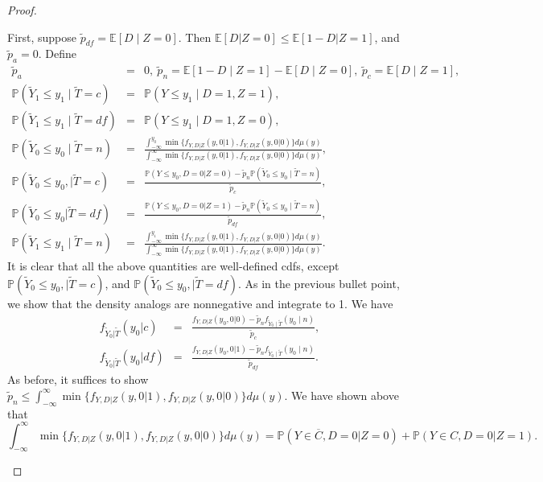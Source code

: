 \documentclass[12pt]{article}
\theoremstyle{plain}
\theoremstyle{definition}
\theoremstyle{remark}
\begin{document}
\begin{proof}
\begin{enumerate}
First, suppose $\tilde{p}_{df}=\mathbb E[D \mid Z=0]$. Then $\mathbb{E}[D  \vert  Z=0] \leq \mathbb{E}[1-D  \vert  Z=1]$, and $\tilde{p}_a=0$. Define
\begin{eqnarray*}
\tilde{p}_a &=& 0, \ \tilde{p}_n=\mathbb E[1-D \mid Z=1]-\mathbb E[D \mid Z=0], \ \tilde{p}_c=\mathbb E[D\mid Z=1],\\
\mathbb P(\tilde{Y}_1 \leq y_1\mid \tilde{T}=c) &=& \mathbb P(Y \leq y_1 \mid D=1, Z=1),\\
\mathbb P(\tilde{Y}_1 \leq y_1\mid \tilde{T}=df) &=& \mathbb P(Y \leq y_1 \mid D=1, Z=0),\\
\mathbb P(\tilde{Y}_0 \leq y_0 \mid \tilde{T}=n) &=& \frac{\int^{y_0}_{-\infty}\min\{f_{Y,D\vert Z}(y,0\vert 1),f_{Y,D\vert Z}(y,0\vert 0)\}d\mu(y)}{\int^{\infty}_{-\infty}\min\{f_{Y,D\vert Z}(y,0\vert 1),f_{Y,D\vert Z}(y,0\vert 0)\}d\mu(y)},\\
\mathbb P(\tilde{Y}_0 \leq y_0, \vert \tilde{T}=c) &=& \frac{\mathbb P(Y \leq y_0, D=0 \vert Z=0)-\tilde{p}_n \mathbb P(\tilde{Y}_0 \leq y_0 \mid \tilde{T}=n)}{\tilde{p}_c},\\
    \mathbb P(\tilde{Y}_0 \leq y_0 \vert \tilde{T}=df) &=& \frac{\mathbb P(Y \leq y_0, D=0 \vert Z=1)-\tilde{p}_n \mathbb P(\tilde{Y}_0 \leq y_0 \mid \tilde{T}=n)}{\tilde{p}_{df}},\\
    \mathbb P(\tilde{Y}_1 \leq y_1 \mid \tilde{T}=n) &=& \frac{\int^{y_1}_{-\infty}\min\{f_{Y,D\vert Z}(y,0\vert 1),f_{Y,D\vert Z}(y,0\vert 0)\}d\mu(y)}{\int^{\infty}_{-\infty}\min\{f_{Y,D\vert Z}(y,0\vert 1),f_{Y,D\vert Z}(y,0\vert 0)\}d\mu(y)}.
\end{eqnarray*}
It is clear that all the above quantities are well-defined cdfs, except $\mathbb P(\tilde{Y}_0 \leq y_0, \vert \tilde{T}=c)$, and $\mathbb P(\tilde{Y}_0 \leq y_0, \vert \tilde{T}=df)$. As in the previous bullet point, we show that the density analogs are nonnegative and integrate to 1. We have 
\begin{eqnarray*}
     f_{\tilde{Y}_0 \vert \tilde{T}}(y_0 \vert c) &=& \frac{f_{Y, D \vert Z}(y_0,0 \vert 0)-\tilde{p}_n f_{\tilde{Y}_0 \mid \tilde{T}}(y_0 \mid n)}{\tilde{p}_c},\\
    f_{\tilde{Y}_0 \vert \tilde{T}}(y_0 \vert df) &=& \frac{f_{Y, D \vert Z}(y_0,0 \vert 1)-\tilde{p}_n f_{\tilde{Y}_0 \mid \tilde{T}}(y_0 \mid n)}{\tilde{p}_{df}}.
\end{eqnarray*}
As before, it suffices to show $\tilde{p}_n \leq \int^{\infty}_{-\infty}\min\{f_{Y,D\vert Z}(y,0\vert 1),f_{Y,D\vert Z}(y,0\vert 0)\}d\mu(y)$. We have shown above that $$\int^{\infty}_{-\infty}\min\{f_{Y,D\vert Z}(y,0\vert 1),f_{Y,D\vert Z}(y,0\vert 0)\}d\mu(y)=\mathbb{P}(Y \in \overline{C}, D=0 \vert Z=0)+\mathbb{P}(Y \in C, D=0 \vert Z=1).$$ 

\end{enumerate}
\end{proof}
\end{document}

